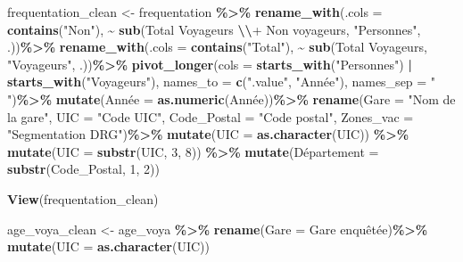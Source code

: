 \documentclass[
]{article}
\newenvironment{Shaded}{\begin{snugshade}}{\end{snugshade}}
\newcommand{\AttributeTok}[1]{\textcolor[rgb]{0.13,0.29,0.53}{#1}}
\newcommand{\DecValTok}[1]{\textcolor[rgb]{0.00,0.00,0.81}{#1}}
\newcommand{\FunctionTok}[1]{\textcolor[rgb]{0.13,0.29,0.53}{\textbf{#1}}}
\newcommand{\NormalTok}[1]{#1}
\newcommand{\OtherTok}[1]{\textcolor[rgb]{0.56,0.35,0.01}{#1}}
\newcommand{\SpecialCharTok}[1]{\textcolor[rgb]{0.81,0.36,0.00}{\textbf{#1}}}
\newcommand{\StringTok}[1]{\textcolor[rgb]{0.31,0.60,0.02}{#1}}
\begin{document}
\begin{Shaded}
\begin{Highlighting}[]
\NormalTok{frequentation\_clean }\OtherTok{\textless{}{-}}\NormalTok{ frequentation }\SpecialCharTok{\%\textgreater{}\%}
  \FunctionTok{rename\_with}\NormalTok{(}\AttributeTok{.cols =} \FunctionTok{contains}\NormalTok{(}\StringTok{"Non"}\NormalTok{), }
              \SpecialCharTok{\textasciitilde{}} \FunctionTok{sub}\NormalTok{(}\StringTok{\textquotesingle{}Total Voyageurs }\SpecialCharTok{\textbackslash{}\textbackslash{}}\StringTok{+ Non voyageurs\textquotesingle{}}\NormalTok{, }\StringTok{"Personnes"}\NormalTok{, .))}\SpecialCharTok{\%\textgreater{}\%}
  \FunctionTok{rename\_with}\NormalTok{(}\AttributeTok{.cols =} \FunctionTok{contains}\NormalTok{(}\StringTok{"Total"}\NormalTok{), }
              \SpecialCharTok{\textasciitilde{}} \FunctionTok{sub}\NormalTok{(}\StringTok{\textquotesingle{}Total Voyageurs\textquotesingle{}}\NormalTok{, }\StringTok{"Voyageurs"}\NormalTok{, .))}\SpecialCharTok{\%\textgreater{}\%}
  \FunctionTok{pivot\_longer}\NormalTok{(}\AttributeTok{cols =} \FunctionTok{starts\_with}\NormalTok{(}\StringTok{"Personnes"}\NormalTok{) }\SpecialCharTok{|} \FunctionTok{starts\_with}\NormalTok{(}\StringTok{"Voyageurs"}\NormalTok{), }
               \AttributeTok{names\_to =} \FunctionTok{c}\NormalTok{(}\StringTok{".value"}\NormalTok{, }\StringTok{"Année"}\NormalTok{), }
               \AttributeTok{names\_sep =} \StringTok{" "}\NormalTok{)}\SpecialCharTok{\%\textgreater{}\%}
  \FunctionTok{mutate}\NormalTok{(Année }\OtherTok{=} \FunctionTok{as.numeric}\NormalTok{(Année))}\SpecialCharTok{\%\textgreater{}\%}
  \FunctionTok{rename}\NormalTok{(}\AttributeTok{Gare =} \StringTok{"Nom de la gare"}\NormalTok{, }\AttributeTok{UIC =} \StringTok{"Code UIC"}\NormalTok{, }\AttributeTok{Code\_Postal =} \StringTok{"Code postal"}\NormalTok{, }\AttributeTok{Zones\_vac =} \StringTok{"Segmentation DRG"}\NormalTok{)}\SpecialCharTok{\%\textgreater{}\%}
  \FunctionTok{mutate}\NormalTok{(}\AttributeTok{UIC =} \FunctionTok{as.character}\NormalTok{(UIC)) }\SpecialCharTok{\%\textgreater{}\%}
  \FunctionTok{mutate}\NormalTok{(}\AttributeTok{UIC =} \FunctionTok{substr}\NormalTok{(UIC, }\DecValTok{3}\NormalTok{, }\DecValTok{8}\NormalTok{)) }\SpecialCharTok{\%\textgreater{}\%}
  \FunctionTok{mutate}\NormalTok{(Département }\OtherTok{=} \FunctionTok{substr}\NormalTok{(Code\_Postal, }\DecValTok{1}\NormalTok{, }\DecValTok{2}\NormalTok{))}
  
\FunctionTok{View}\NormalTok{(frequentation\_clean)}

\NormalTok{age\_voya\_clean }\OtherTok{\textless{}{-}}\NormalTok{ age\_voya }\SpecialCharTok{\%\textgreater{}\%}
  \FunctionTok{rename}\NormalTok{(}\AttributeTok{Gare =} \StringTok{\textasciigrave{}}\AttributeTok{Gare enquêtée}\StringTok{\textasciigrave{}}\NormalTok{)}\SpecialCharTok{\%\textgreater{}\%}
  \FunctionTok{mutate}\NormalTok{(}\AttributeTok{UIC =} \FunctionTok{as.character}\NormalTok{(UIC))}
  


\end{Highlighting}
\end{Shaded}
\end{document}

